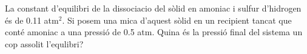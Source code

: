 \begin{exr}{}
La constant d'equilibri de la dissociacio del  sòlid en amoniac i sulfur d'hidrogen és de 0.11 atm$^2$. Si posem una mica d'aquest sòlid en un recipient tancat que conté amoniac a una pressió de 0.5 atm. Quina és la pressió final del sistema un cop assolit l'equlibri?
\end{exr}
